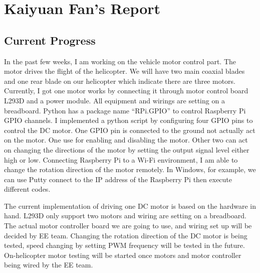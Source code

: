 \documentclass[letterpaper, 10, draftclsnofoot, onecolumn,compsoc]{IEEEtran}
\begin{document}
\section{Kaiyuan Fan's Report}
\subsection{Current Progress}
	In the past few weeks, I am working on the vehicle motor control part. The motor drives the flight of the helicopter. We will have two main coaxial blades and one rear blade on our helicopter which indicate there are three motors. Currently, I got one motor works by connecting it through motor control board L293D and a power module. All equipment and wirings are setting on a breadboard. Python has a package name “RPi.GPIO” to control Raspberry Pi GPIO channels. I implemented a python script by configuring four GPIO pins to control the DC motor. One GPIO pin is connected to the ground not actually act on the motor. One use for enabling and disabling the motor. Other two can act on changing the directions of the motor by setting the output signal level either high or low. Connecting Raspberry Pi to a Wi-Fi environment, I am able to change the rotation direction of the motor remotely. In Windows, for example, we can use Putty connect to the IP address of the Raspberry Pi then execute different codes.

The current implementation of driving one DC motor is based on the hardware in hand. L293D only support two motors and wiring are setting on a breadboard. The actual motor controller board we are going to use, and wiring set up will be decided by EE team. Changing the rotation direction of the DC motor is being tested, speed changing by setting PWM frequency will be tested in the future. On-helicopter motor testing will be started once motors and motor controller being wired by the EE team.
\end{document}
